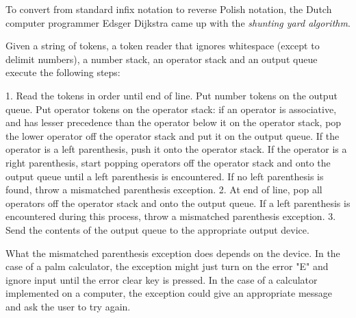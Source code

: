 \documentclass[12pt]{article}
\begin{document}
To convert from standard infix notation to reverse Polish notation, the Dutch computer programmer Edsger Dijkstra came up with the \emph{shunting yard algorithm}.

Given a string of tokens, a token reader that ignores whitespace (except to delimit numbers), a number stack, an operator stack and an output queue execute the following steps:

1. Read the tokens in order until end of line. Put number tokens on the output queue. Put operator tokens on the operator stack: if an operator is associative, and has lesser precedence than the operator below it on the operator stack, pop the lower operator off the operator stack and put it on the output queue. If the operator is a left parenthesis, push it onto the operator stack. If the operator is a right parenthesis, start popping operators off the operator stack and onto the output queue until a left parenthesis is encountered. If no left parenthesis is found, throw a mismatched parenthesis exception.
2. At end of line, pop all operators off the operator stack and onto the output queue. If a left parenthesis is encountered during this process, throw a mismatched parenthesis exception.
3. Send the contents of the output queue to the appropriate output device.

What the mismatched parenthesis exception does depends on the device. In the case of a palm calculator, the exception might just turn on the error "E" and ignore input until the error clear key is pressed. In the case of a calculator implemented on a computer, the exception could give an appropriate message and ask the user to try again.
\end{document}
